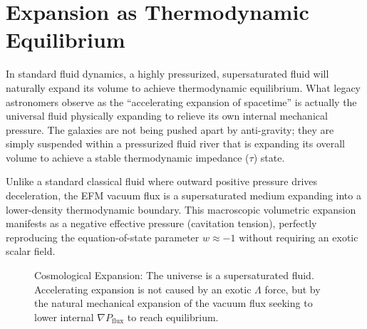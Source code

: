 \documentclass[11pt, a4paper, table]{article}
\begin{document}
\section{Expansion as Thermodynamic Equilibrium}
  In standard fluid dynamics, a highly pressurized, supersaturated fluid will naturally expand its volume to achieve thermodynamic equilibrium. What legacy astronomers observe as the ``accelerating expansion of spacetime'' is actually the universal fluid physically expanding to relieve its own internal mechanical pressure. The galaxies are not being pushed apart by anti-gravity; they are simply suspended within a pressurized fluid river that is expanding its overall volume to achieve a stable thermodynamic impedance ($\tau$) state.

  Unlike a standard classical fluid where outward positive pressure drives deceleration, the EFM vacuum flux is a supersaturated medium expanding into a lower-density thermodynamic boundary. This macroscopic volumetric expansion manifests as a negative effective pressure (cavitation tension), perfectly reproducing the equation-of-state parameter $w \approx -1$ without requiring an exotic scalar field.

  \begin{figure}[!ht]
    \centering
    \caption{Cosmological Expansion: The universe is a supersaturated fluid. Accelerating expansion is not caused by an exotic $\Lambda$ force, but by the natural mechanical expansion of the vacuum flux seeking to lower internal $\nabla P_{\text{flux}}$ to reach equilibrium.}
    \label{fig:expansion}
  \end{figure}
\end{document}
